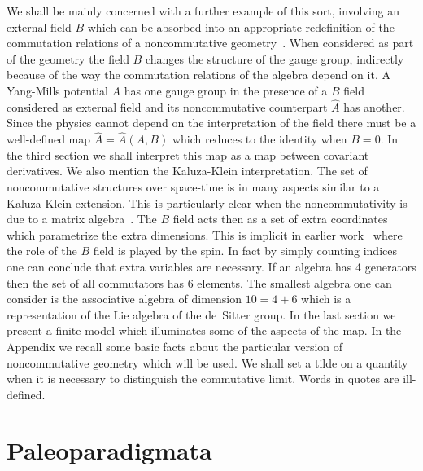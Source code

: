 \documentclass[a4paper,12pt]{article}
\def\h#1{\hat #1}
\newcommand{\initiate}{\setcounter{equation}{0}}
\begin{document}
We shall be mainly concerned with a further example of this sort,
involving an external field $B$ which can be absorbed into an
appropriate redefinition of the commutation relations of a
noncommutative geometry~\cite{Sch99}.  When considered as part of the
geometry the field $B$ changes the structure of the gauge group,
indirectly because of the way the commutation relations of the algebra
depend on it. A Yang-Mills potential $A$ has one gauge group in the
presence of a $B$ field considered as external field and its
noncommutative counterpart $\h{A}$ has another. Since the physics
cannot depend on the interpretation of the field there must be a
well-defined map $\h{A} = \h{A}(A,B)$ which reduces to the identity
when $B=0$. In the third section we shall interpret this map as a map
between covariant derivatives. We also mention the Kaluza-Klein
interpretation. The set of noncommutative structures over space-time
is in many aspects similar to a Kaluza-Klein extension. This is
particularly clear when the noncommutativity is due to a matrix
algebra~\cite{Mad89c}. The $B$ field acts then as a set of extra
coordinates which parametrize the extra dimensions. This is implicit
in earlier work~\cite{Sny47a,Mad89c} where the role of the $B$ field is
played by the spin. In fact by simply counting indices one can
conclude that extra variables are necessary. If an algebra has 4
generators then the set of all commutators has 6 elements. The
smallest algebra one can consider is the associative algebra of
dimension $10=4+6$ which is a representation of the Lie algebra of the
de~Sitter group. In the last section we present a finite model which
illuminates some of the aspects of the map. In the Appendix we recall
some basic facts about the particular version of noncommutative
geometry which will be used.  We shall set a tilde on a quantity when
it is necessary to distinguish the commutative limit.  Words in quotes
are ill-defined.


\initiate
\section{Paleoparadigmata}   
\end{document}
